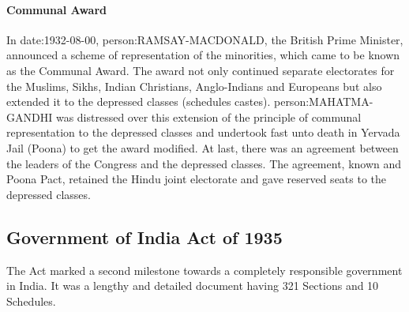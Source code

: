 \begin{multicol}{2}
\paragraph{Communal Award}
In \gls{date:1932-08-00}, \gls{person:RAMSAY-MACDONALD}, the British Prime Minister, announced a scheme of representation of the minorities, which came to be known as the Communal Award. The award not only continued separate electorates for the Muslims, Sikhs, Indian Christians, Anglo-Indians and Europeans but also extended it to the depressed classes (schedules castes). \gls{person:MAHATMA-GANDHI} was distressed over this extension of the principle of communal representation to the depressed classes and undertook fast unto death in Yervada Jail (Poona) to get the award modified. At last, there was an agreement between the leaders of the Congress and the depressed classes. The agreement, known and Poona Pact, retained the Hindu joint electorate and gave reserved seats to the depressed classes.



\subsection{Government of India Act of 1935}

The Act marked a second milestone towards a completely responsible government in India. It was a lengthy and detailed document having 321 Sections and 10 Schedules.


\end{multicol}
